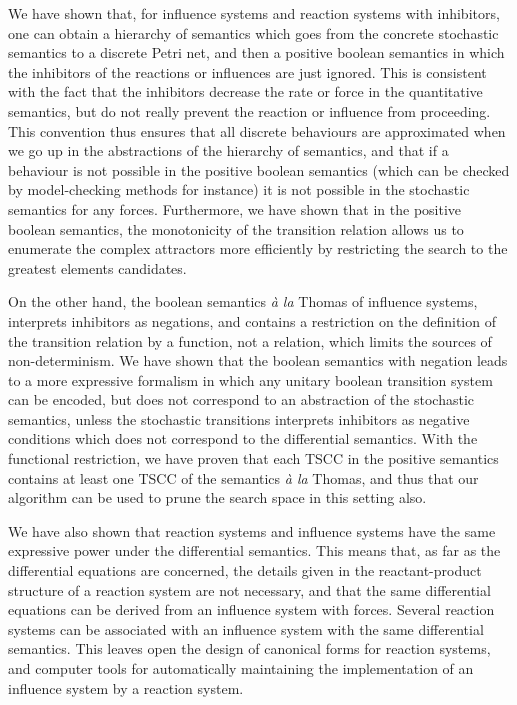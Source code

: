 \documentclass{llncs}
\begin{document}
We have shown that, for influence systems and reaction systems with inhibitors, one can obtain
a hierarchy of semantics %
which goes from the concrete stochastic semantics to a discrete Petri net, and then a positive boolean semantics
in which the inhibitors of the reactions or influences are just ignored.
This is consistent with the fact that the inhibitors decrease the rate or force
in the quantitative semantics, but do not really prevent the reaction or influence from proceeding.
This convention thus ensures that all discrete behaviours are approximated when we go up in the abstractions of the hierarchy of semantics,
and that if a behaviour is not possible in the positive boolean semantics (which can be checked by model-checking methods for instance)
it is not possible in the stochastic semantics for any forces.
Furthermore, we have shown that in the positive boolean semantics, the monotonicity of the
transition relation allows us to enumerate the complex attractors more efficiently by restricting the search to the greatest elements candidates.

On the other hand, the boolean semantics \emph{\`a la} Thomas of influence systems,
interprets inhibitors as negations, and %
contains a restriction on the definition of the transition relation by a function, not a relation, which limits the sources of non-determinism.
We have shown that the boolean semantics with negation leads to a more expressive formalism
in which any unitary boolean transition system can be encoded,
but does not correspond to an abstraction of the stochastic semantics,
unless the stochastic transitions interprets inhibitors as negative conditions
which does not correspond to the differential semantics.
With the functional restriction, we have proven that each TSCC in the positive semantics
contains at least one TSCC of the semantics \emph{\`a la} Thomas,
and thus that our algorithm can be used to prune the search space in this setting also.

We have also shown that reaction systems and influence systems
have the same expressive power under the differential semantics.
This means that, as far as the differential equations are concerned,
the details given in the reactant-product structure of a reaction system
are not necessary, and that the same differential equations can be derived
from an influence system with forces.
Several reaction systems can be associated with an influence system
with the same differential semantics.
This leaves open the design of canonical forms for reaction systems, and computer tools for automatically maintaining
the implementation of an influence system
by a reaction system.
\end{document}
